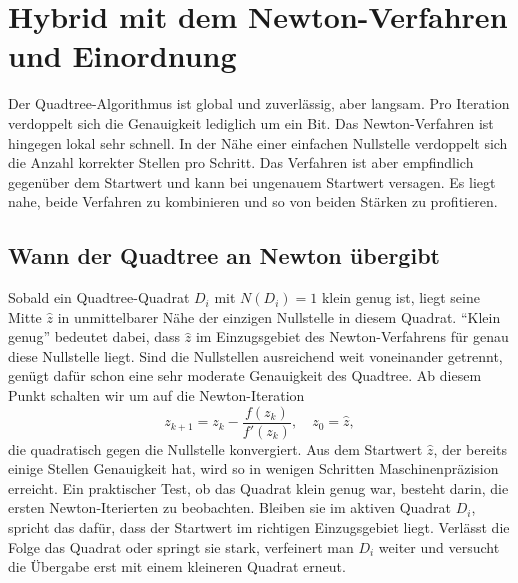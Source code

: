 %
%
%
%
\section{Hybrid mit dem Newton-Verfahren und Einordnung%
\label{weyl:section:hybrid}}
Der Quadtree-Algorithmus ist global und zuverlässig, aber langsam. Pro Iteration
verdoppelt sich die Genauigkeit lediglich um ein Bit.
Das Newton-Verfahren ist hingegen lokal sehr schnell. In der Nähe einer einfachen
Nullstelle verdoppelt sich die Anzahl korrekter Stellen pro Schritt. Das Verfahren ist aber empfindlich
gegenüber dem Startwert und kann bei ungenauem Startwert versagen.
Es liegt nahe, beide Verfahren zu kombinieren und so von beiden Stärken zu profitieren.

\subsection{Wann der Quadtree an Newton übergibt%
\label{weyl:subsection:uebergabe}}
Sobald ein Quadtree-Quadrat $D_i$ mit $N(D_i) = 1$ klein genug ist, liegt seine
Mitte $\hat z$ in unmittelbarer Nähe der einzigen Nullstelle in diesem Quadrat.
``Klein genug'' bedeutet dabei, dass $\hat z$ im Einzugsgebiet des Newton-Verfahrens
für genau diese Nullstelle liegt. Sind die Nullstellen ausreichend weit voneinander
getrennt, genügt dafür schon eine sehr moderate Genauigkeit des Quadtree.
Ab diesem Punkt schalten wir um auf die Newton-Iteration
\begin{equation}
z_{k+1}
=
z_k
-
\frac{f(z_k)}{f'(z_k)}
,
\quad
z_0
=
\hat z
,
\label{weyl:eq:newton}
\end{equation}
die quadratisch gegen die Nullstelle konvergiert.
Aus dem Startwert $\hat z$, der bereits einige Stellen Genauigkeit hat, wird so in
wenigen Schritten Maschinenpräzision erreicht.
Ein praktischer Test, ob das Quadrat klein genug war, besteht darin, die ersten
Newton-Iterierten zu beobachten.
Bleiben sie im aktiven Quadrat $D_i$, spricht das dafür, dass der Startwert im
richtigen Einzugsgebiet liegt.
Verlässt die Folge das Quadrat oder springt sie stark, verfeinert man $D_i$ weiter
und versucht die Übergabe erst mit einem kleineren Quadrat erneut.



